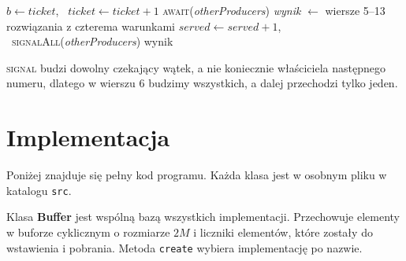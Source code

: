 \documentclass[11pt,a4paper]{article}
\newenvironment{algorytm}[1][htb]
  {\par\bigskip\floatname{algorithm}{}\renewcommand{\thealgorithm}{}
   \begin{algorithm}[#1]%
  }{\end{algorithm}\par\bigskip}
\begin{document}
\begin{algorytm}[H]
\begin{algorithmic}[1]
        \State $b \gets \textit{ticket}$, \ $\textit{ticket} \gets \textit{ticket} + 1$
            \State \textsc{await}(\textit{otherProducers})
        \EndWhile
        \State \textit{wynik} $\gets$ wiersze 5--13 rozwiązania z czterema warunkami
        \State $\textit{served} \gets \textit{served} + 1$, \ \textsc{signalAll}(\textit{otherProducers})
        \State \Return wynik
    \EndProcedure
\end{algorithmic}
\caption{Wstawianie z kolejką biletową}
\end{algorytm}

\textsc{signal} budzi dowolny czekający wątek, a nie koniecznie właściciela następnego numeru,
dlatego w wierszu 6 budzimy wszystkich, a dalej przechodzi tylko jeden.

\pagebreak
\section{Implementacja}
Poniżej znajduje się pełny kod programu. Każda klasa jest w osobnym pliku w katalogu \texttt{src}.

Klasa \textbf{Buffer} jest wspólną bazą wszystkich implementacji. Przechowuje elementy w buforze cyklicznym o rozmiarze $2M$ i liczniki elementów, które zostały do wstawienia i pobrania. Metoda \texttt{create} wybiera implementację po nazwie.
\end{document}
